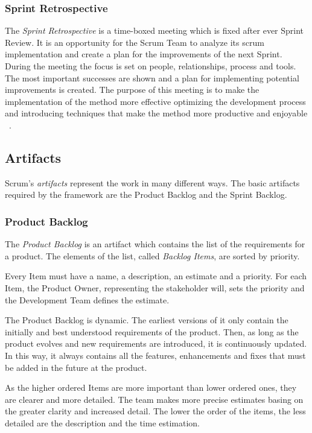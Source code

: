 			\subsubsection{Sprint Retrospective}\label{ref_scrum_sprint_retro}
			The \emph{Sprint Retrospective} is a time-boxed meeting which is fixed after ever Sprint Review. It is an opportunity for the Scrum Team to analyze its scrum implementation and create a plan for the improvements of the next Sprint. 
			During the meeting the focus is set on people, relationships, process and tools. The most important successes are shown and a plan for implementing potential improvements is created. 
			The purpose of this meeting is to make the implementation of the method more effective optimizing the development process and introducing techniques that make the method more productive and enjoyable ~\cite{scrumEnglishGuide}. 

		
		\subsection{Artifacts}\label{ref_scrum_artifacts}
			Scrum's \emph{artifacts} represent the work in many different ways. The basic artifacts required by the framework are the Product Backlog and the Sprint Backlog.

			\subsubsection{Product Backlog}\label{ref_scrum_prod_backlog}
			The \emph{Product Backlog} is an artifact which contains the list of the requirements for a product. The elements of the list, called \emph{Backlog Items}, are sorted by priority. 

			Every Item must have a name, a description, an estimate and a priority. For each Item, the Product Owner, representing the stakeholder will, sets the priority and	 the Development Team defines the estimate.

			The Product Backlog is dynamic. The earliest versions of it only contain the initially and best understood requirements of the product. Then, as long as the product evolves and new requirements are introduced, it is continuously updated. In this way, it always contains all the features, enhancements and fixes that must be added in the future at the product. 

			As the higher ordered Items are more important than lower ordered ones, they are clearer and more detailed. The team makes more precise estimates basing on the greater clarity and increased detail. The lower the order of the items, the less detailed are the description and the time estimation.
			

